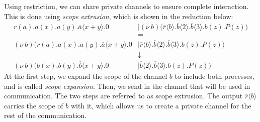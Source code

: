 \documentclass[a4paper, openany]{memoir}
\theoremstyle{definition}
\begin{document}
    Using restriction, we can share private channels to ensure complete interaction. This is done using \emph{scope extrusion}, which is shown in the reduction below:
    \begin{align*}
        r(a).a(x).a(y).\overline{a} \langle x + y \rangle.0 &\mid (\nu \ b)\textbf{(}\overline{r}\langle b \rangle.\overline{b} \langle 2 \rangle.\overline{b} \langle 3 \rangle.b(z).P(z) \textbf{)} \\
        &= \\
        (\nu \ b)\textbf{(}r(a).a(x).a(y).\overline{a} \langle x + y \rangle.0 &\mid \overline{r}\langle b \rangle.\overline{b} \langle 2 \rangle.\overline{b} \langle 3 \rangle.b(z).P(z) \textbf{)} \\
        &\downarrow \\
        (\nu \ b)\textbf{(}b(x).b(y).\overline{b} \langle x + y \rangle.0 &\mid \overline{b} \langle 2 \rangle.\overline{b} \langle 3 \rangle.b(z).P(z) \textbf{)} 
    \end{align*}
    At the first step, we expand the scope of the channel $b$ to include both processes, and is called \emph{scope expansion}. Then, we send in the channel that will be used in communication. The two steps are referred to as scope extrusion. The output $\overline{r} \langle b \rangle$ carries the scope of $b$ with it, which allows us to create a private channel for the rest of the communication.
    
\end{document}
